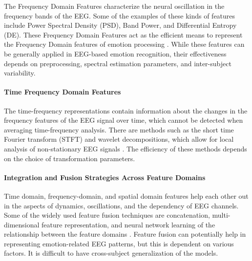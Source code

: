 \documentclass[ASNA,twocolumn]{USG}
\begin{document}
The Frequency Domain Features characterize the neural oscillation in the frequency bands of the EEG. Some of the examples of these kinds of features include Power Spectral Density (PSD), Band Power, and Differential Entropy (DE). These Frequency Domain Features act as the efficient means to represent the Frequency Domain features of emotion processing \cite{arnau2017fusing,li2021multi}. While these features can be generally applied in EEG-based emotion recognition, their effectiveness depends on preprocessing, spectral estimation parameters, and inter-subject variability.

\paragraph{Time Frequency Domain Features}

The time-frequency representations contain information about the changes in the frequency features of the EEG signal over time, which cannot be detected when averaging time-frequency analysis. There are methods such as the short time Fourier transform (STFT) and wavelet decompositions, which allow for local analysis of non-stationary EEG signals \cite{li2021multi}. The efficiency of these methods depends on the choice of transformation parameters.

\paragraph{Integration and Fusion Strategies Across Feature Domains}

Time domain, frequency-domain, and spatial domain features help each other out in the aspects of dynamics, oscillations, and the dependency of EEG channels. Some of the widely used feature fusion techniques are concatenation, multi-dimensional feature representation, and neural network learning of the relationship between the feature domains \cite{arnau2017fusing,li2022multi}. Feature fusion can potentially help in representing emotion-related EEG patterns, but this is dependent on various factors. It is difficult to have cross-subject generalization of the models.
\end{document}
